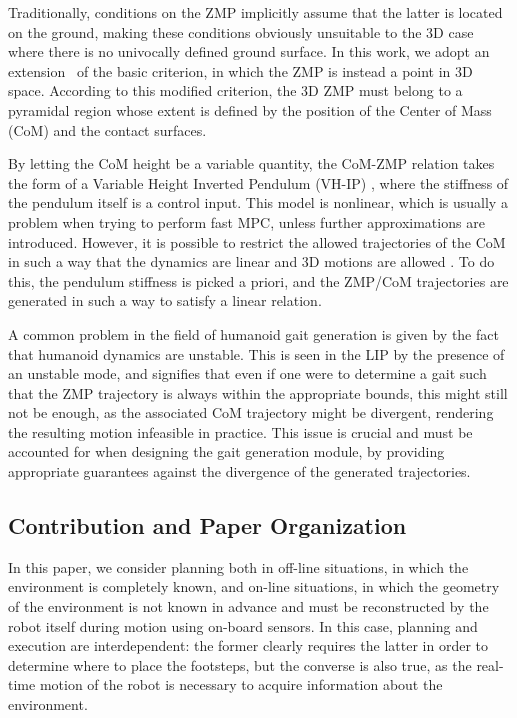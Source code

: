 Traditionally, conditions on the ZMP implicitly assume that the latter is located on the ground, making these conditions obviously unsuitable to the 3D case where there is no univocally defined ground surface. In this work, we adopt an extension~\cite{SuImYaCa:2021} of the basic criterion, in which the ZMP is instead a point in 3D space. According to this modified criterion, the 3D ZMP must belong to a pyramidal region whose extent is defined by the position of the Center of Mass (CoM) and the contact surfaces.



By letting the CoM height be a variable quantity, the CoM-ZMP relation takes the form of a Variable Height Inverted Pendulum (VH-IP) \cite{CaEdLaMa:18}, where the stiffness of the pendulum itself is a control input. This model is nonlinear, which is usually a problem when trying to perform fast MPC, unless further approximations are introduced. However, it is possible to restrict the allowed trajectories of the CoM in such a way that the dynamics are linear and 3D motions are allowed \cite{ZaScLaOr:18, FeScLaOr:19}. To do this, the pendulum stiffness is picked a priori, and the ZMP/CoM trajectories are generated in such a way to satisfy a linear relation.

A common problem in the field of humanoid gait generation is given by the fact that humanoid dynamics are unstable. This is seen in the LIP by the presence of an unstable mode, and signifies that even if one were to determine a gait such that the ZMP trajectory is always within the appropriate bounds, this might still not be enough, as the associated CoM trajectory might be divergent, rendering the resulting motion infeasible in practice. This issue is crucial and must be accounted for when designing the gait generation module, by providing appropriate guarantees against the divergence of the generated trajectories.

\subsection{Contribution and Paper Organization}

In this paper, we consider planning both in off-line situations, in which the environment is completely known, and on-line situations, in which the geometry of the environment is not known in advance and must be reconstructed by the robot itself during motion using on-board sensors. In this case, planning and execution are interdependent: the former clearly requires the latter in order to determine where to place the footsteps, but the converse is also true, as the real-time motion of the robot is necessary to acquire information about the environment.

